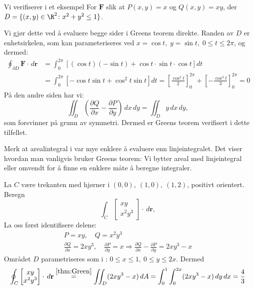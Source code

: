 \begin{eks}{Vi verifiserer   i et eksempel} \label{ex:greenveri}
For \( \mathbf{F}\) slik at \(P(x, y) = x \) og \( Q(x, y) = xy \), der \( D = \{(x,y) \in \R^2 \colon x^2 + y^2 \leq 1 \} \).

Vi gjør dette ved å evaluere begge sider i Greens teorem direkte. Randen av \( D \) er enhetsirkelen, som kan parameteriseres ved  
\( x = \cos t, \; y = \sin t, \; 0 \leq t \leq 2\pi \), og dermed:
\begin{align*}
\oint_{\partial D} \mathbf{F}\cdot\, d\mathbf{r} &=
\int_0^{2\pi} \left[(\cos t)(-\sin t) + \cos t \cdot \sin t \cdot \cos t\right] dt
\\ &= \int_0^{2\pi} \left[ -\cos t \sin t + \cos^2 t \sin t \right] dt
= \left[ \frac{\cos^2 t}{2} \right]_0^{2\pi} + \left[ -\frac{\cos^3 t}{3} \right]_0^{2\pi} = 0
\end{align*}
På den andre siden har vi:
\[
\iint_D \left( \frac{\partial Q}{\partial x} - \frac{\partial P}{\partial y} \right) \, dx\,dy
= \iint_D y \, dx\,dy,
\]
som forsvinner på grunn av symmetri. Dermed er Greens teorem verifisert i dette tilfellet.
\end{eks}
%
\begin{rem}{}
 Merk at arealintegral i  var mye enklere å evaluere enn linjeintegralet. Det viser hvordan man vanligvis bruker Greens teorem: Vi bytter areal med linjeintegral eller omvendt for å finne en enklere måte å beregne integraler.
\end{rem}
%
\begin{eks}{}
La \( C \) være trekanten med hjørner i \( (0,0),\ (1,0),\ (1,2) \), positivt orientert. Beregn
\[
\int_C \begin{bmatrix} xy\\ x^2 y^3\end{bmatrix} \cdot \, d\mathbf{r},
\]
La oss først identifisere delene:
\begin{align*}
P = xy, \quad Q = x^2 y^3
\\
\frac{\partial Q}{\partial x} = 2x y^3, \quad \frac{\partial P}{\partial y} = x
\Rightarrow \frac{\partial Q}{\partial x} - \frac{\partial P}{\partial y} = 2x y^3 - x
\end{align*}
Området $D$ parametriseres som i : \( 0 \leq x \leq 1,\ 0 \leq y \leq 2x \). 
Dermed 
\[
\oint_C \begin{bmatrix} xy\\ x^2 y^3\end{bmatrix} \cdot \, d\mathbf{r} \stackrel{\Cref{thm:Green}}{=} \iint_D (2x y^3 - x)\, dA = \int_0^1 \int_0^{2x} (2x y^3 - x)\, dy\, dx = \frac{4}{3}
\]
\end{eks}
\newpage

